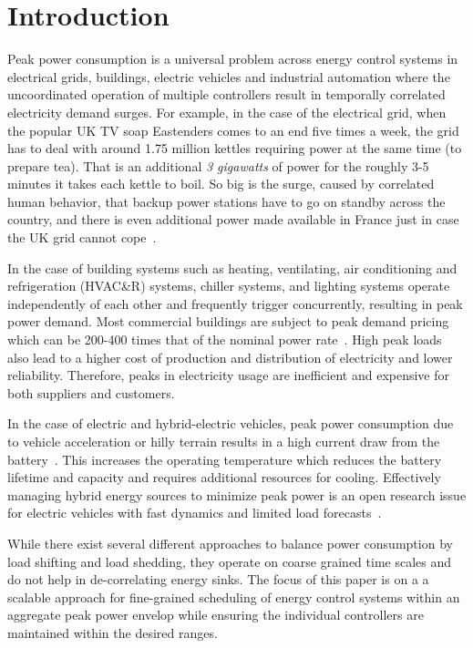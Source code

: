 \section{Introduction}
\label{sec:intro}

Peak power consumption is a universal problem across energy control systems in electrical grids, buildings, electric vehicles and industrial automation where the uncoordinated operation of multiple controllers result in  temporally correlated electricity demand surges. For example, in the case of the electrical grid, when the popular UK TV soap Eastenders comes to an end five times a week, the grid has to deal with around 1.75 million kettles requiring power at the same time (to prepare tea). That is an additional \emph{3 gigawatts} of power for the roughly 3-5 minutes it takes each kettle to boil. So big is the surge, caused by correlated human behavior, that backup power stations have to go on standby across the country, and there is even additional power made available in France just in case the UK grid cannot cope~\cite{tvpickup}. 

In the case of building systems such as heating, ventilating, air conditioning and refrigeration (HVAC\&R) systems, chiller systems, and lighting systems operate independently of each other and frequently trigger concurrently, resulting in peak power demand. Most commercial buildings are subject to peak demand pricing which can be 200-400 times that of the nominal power rate~\cite{trfpeco}. High peak loads also lead to a higher cost of production and distribution of electricity and lower reliability. Therefore, peaks in electricity usage are inefficient and expensive for both suppliers and customers.

In the case of electric and hybrid-electric vehicles, peak power consumption due to vehicle acceleration or hilly terrain results in a high current draw from the battery~\cite{battery}. This increases the operating temperature which reduces the battery lifetime and capacity and requires additional resources for cooling. Effectively managing hybrid energy sources to minimize peak power is an open research issue for electric vehicles with fast dynamics and limited load forecasts~\cite{hybrid}.

While there exist several different approaches to balance power consumption by load shifting and load shedding, they operate on coarse grained time scales and do not help in de-correlating energy sinks.
The focus of this paper is on a a scalable approach for fine-grained scheduling of energy control systems within an aggregate peak power envelop while ensuring the individual controllers are maintained within the desired ranges.

